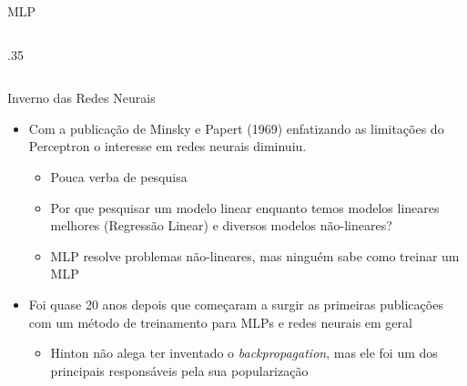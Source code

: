 \documentclass[aspectratio=169, xcolor=dvipsnames]{beamer}
\begin{document}
\begin{frame}{MLP}
\begin{columns}
\begin{column}{.35\linewidth}
{}
      \end{column}
    \end{columns}
     
  \end{frame}

  \begin{frame}{Inverno das Redes Neurais}
    \begin{itemize}
      \item Com a publicação de Minsky e Papert (1969) enfatizando as limitações
        do Perceptron\cite{minsky1969perceptron} o interesse em redes neurais
        diminuiu.
        \begin{itemize}
          \item Pouca verba de pesquisa

          \item Por que pesquisar um modelo linear enquanto temos modelos lineares
            melhores (Regressão Linear) e diversos modelos não-lineares?

          \item MLP resolve problemas não-lineares, mas ninguém sabe como
            treinar um MLP
        \end{itemize}

      \item Foi quase 20 anos depois que começaram a surgir as primeiras publicações
        com um método de treinamento para MLPs e redes neurais em geral
        \begin{itemize}
          \item Hinton não alega ter inventado o \textit{backpropagation}, mas ele
            foi um dos principais responsáveis pela sua popularização
        \end{itemize}
    \end{itemize}
  \end{frame}
\end{document}
